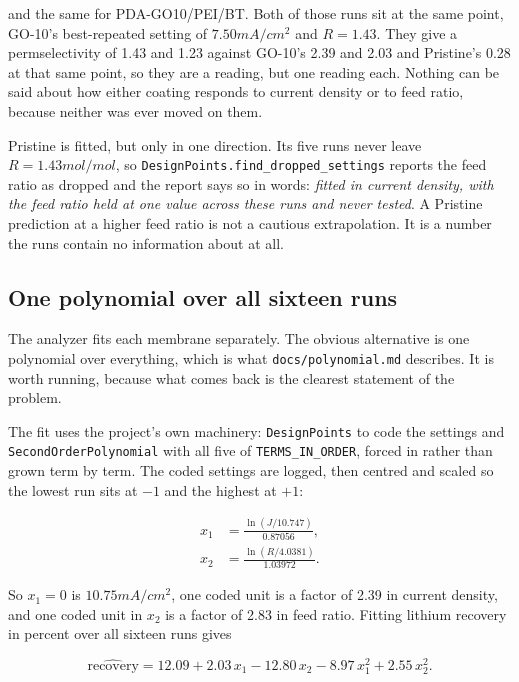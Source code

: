 and the same for PDA-GO10/PEI/BT. Both of those runs sit at the same point, GO-10's
best-repeated setting of $7.50\unit{mA/cm^2}$ and $R = 1.43$. They give a permselectivity
of 1.43 and 1.23 against GO-10's 2.39 and 2.03 and Pristine's 0.28 at that same point, so
they are a reading, but one reading each. Nothing can be said about how either coating
responds to current density or to feed ratio, because neither was ever moved on them.

Pristine is fitted, but only in one direction. Its five runs never leave
$R = 1.43\unit{mol/mol}$, so \texttt{DesignPoints.find\_dropped\_settings} reports the
feed ratio as dropped and the report says so in words: \emph{fitted in current density,
with the feed ratio held at one value across these runs and never tested}. A Pristine
prediction at a higher feed ratio is not a cautious extrapolation. It is a number the
runs contain no information about at all.

\subsection{One polynomial over all sixteen runs}
\label{sec:limits:pooled}

The analyzer fits each membrane separately. The obvious alternative is one polynomial
over everything, which is what \texttt{docs/polynomial.md} describes. It is worth running,
because what comes back is the clearest statement of the problem.

The fit uses the project's own machinery: \texttt{DesignPoints} to code the settings and
\texttt{SecondOrderPolynomial} with all five of \texttt{TERMS\_IN\_ORDER}, forced in
rather than grown term by term. The coded settings are logged, then centred and scaled so
the lowest run sits at $-1$ and the highest at $+1$:

\begin{align}
  x_1 &= \frac{\ln\!\left(J / 10.747\right)}{0.87056}, \label{eq:limits:x1} \\
  x_2 &= \frac{\ln\!\left(R / 4.0381\right)}{1.03972}. \label{eq:limits:x2}
\end{align}

So $x_1 = 0$ is $10.75\unit{mA/cm^2}$, one coded unit is a factor of 2.39 in current
density, and one coded unit in $x_2$ is a factor of 2.83 in feed ratio. Fitting lithium
recovery in percent over all sixteen runs gives

\begin{equation}
  \widehat{\text{recovery}} = 12.09 + 2.03\,x_1 - 12.80\,x_2 - 8.97\,x_1^2 + 2.55\,x_2^2 .
  \label{eq:limits:pooled}
\end{equation}

